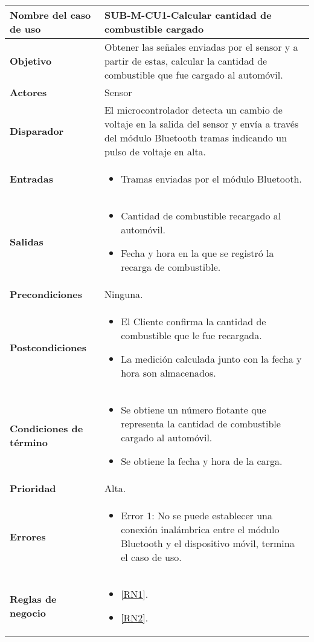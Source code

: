 \begin{longtable}{|J{5cm}|J{10.3cm}|}
	\hline
	\textbf{Nombre del caso de uso} &
		SUB-M-CU1-Calcular cantidad de combustible cargado \\ \hline
	\textbf{Objetivo} &
		Obtener las señales enviadas por el sensor y a partir de estas, calcular la cantidad de combustible que fue cargado al automóvil. \\ \hline
	\textbf{Actores} &
		Sensor \\ \hline 
	\textbf{Disparador} & 
		El microcontrolador detecta un cambio de voltaje en la salida del sensor y envía a través del módulo Bluetooth tramas indicando un pulso de voltaje en alta. \\ \hline 
	\textbf{Entradas} & 
		\begin{itemize}
				\item Tramas enviadas por el módulo Bluetooth.
		\end{itemize}\\ \hline 
	\textbf{Salidas} & 
		\begin{itemize}
			\item Cantidad de combustible recargado al automóvil.
			\item Fecha y hora en la que se registró la recarga de combustible.
		\end{itemize} \\ \hline
	\textbf{Precondiciones} &
		Ninguna.\\ \hline
	\textbf{Postcondiciones} &
		\begin{itemize}
			\item El Cliente confirma la cantidad de combustible que le fue recargada.
			\item La medición calculada junto con la fecha y hora son almacenados.
		\end{itemize}\\ \hline
	\textbf{Condiciones de término} & 
		\begin{itemize}
			\item Se obtiene un número flotante que representa la cantidad de combustible cargado al automóvil.
			\item Se obtiene la fecha y hora de la carga.
		\end{itemize} \\ \hline 
	\textbf{Prioridad} & 
		Alta. \\ \hline
	\textbf{Errores} & 
		\begin{itemize}
			\item \label{SUB-M-CU1:Error1} Error 1: No se puede establecer una conexión inalámbrica entre el módulo Bluetooth y el dispositivo móvil, termina el caso de uso.
		\end{itemize} \\ \hline
	\textbf{Reglas de negocio} & 
		\begin{itemize}
			\item \ref{RN1}.
			\item \ref{RN2}.
		\end{itemize} \\ \hline

\end{longtable}


